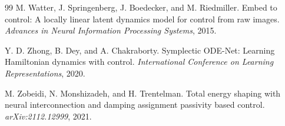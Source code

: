 \documentclass{article}
\begin{document}
\begin{thebibliography}{99}
M. Watter, J. Springenberg, J. Boedecker, and M. Riedmiller.
\newblock Embed to control: A locally linear latent dynamics model for control from raw images.
\newblock \emph{Advances in Neural Information Processing Systems}, 2015.

Y. D. Zhong, B. Dey, and A. Chakraborty.
\newblock Symplectic ODE-Net: Learning Hamiltonian dynamics with control.
\newblock \emph{International Conference on Learning Representations}, 2020.

M. Zobeidi, N. Monshizadeh, and H. Trentelman.
\newblock Total energy shaping with neural interconnection and damping assignment passivity based control.
\newblock \emph{arXiv:2112.12999}, 2021.

\end{thebibliography}
\end{document}

